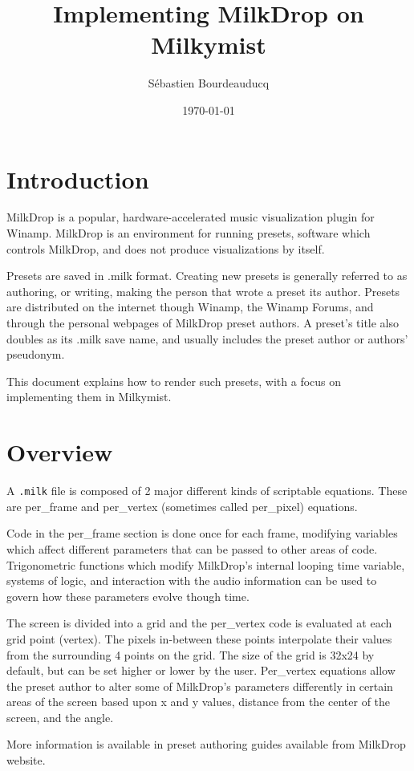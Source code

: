 \documentclass[a4paper,11pt]{article}
\title{Implementing MilkDrop on Milkymist}
\author{S\'ebastien Bourdeauducq}
\date{\today}
\begin{document}
\maketitle{}
\section{Introduction}
MilkDrop is a popular, hardware-accelerated music visualization plugin for Winamp. MilkDrop is an environment for running presets, software which controls MilkDrop, and does not produce visualizations by itself.

Presets are saved in .milk format. Creating new presets is generally referred to as authoring, or writing, making the person that wrote a preset its author. Presets are distributed on the internet though Winamp, the Winamp Forums, and through the personal webpages of MilkDrop preset authors. A preset's title also doubles as its .milk save name, and usually includes the preset author or authors' pseudonym.

This document explains how to render such presets, with a focus on implementing them in Milkymist.

\section{Overview}
A \verb!.milk! file is composed of 2 major different kinds of scriptable equations. These are per\_frame and per\_vertex (sometimes called per\_pixel) equations.

Code in the per\_frame section is done once for each frame, modifying variables which affect different parameters that can be passed to other areas of code. Trigonometric functions which modify MilkDrop's internal looping time variable, systems of logic, and interaction with the audio information can be used to govern how these parameters evolve though time.

The screen is divided into a grid and the per\_vertex code is evaluated at each grid point (vertex). The pixels in-between these points interpolate their values from the surrounding 4 points on the grid. The size of the grid is 32x24 by default, but can be set higher or lower by the user. Per\_vertex equations allow the preset author to alter some of MilkDrop's parameters differently in certain areas of the screen based upon x and y values, distance from the center of the screen, and the angle.

More information is available in preset authoring guides available from MilkDrop website.
\end{document}
